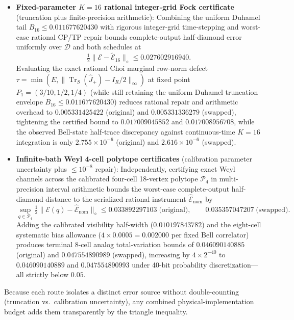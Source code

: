 \documentclass[11pt,letterpaper]{article}
\theoremstyle{definition}
\providecommand{\tightlist}{\setlength{\itemsep}{2pt}\setlength{\parskip}{0pt}}
\begin{document}
\begin{itemize}
\tightlist
\item
  \textbf{Fixed-parameter \(K=16\) rational integer-grid Fock
  certificate} (truncation plus finite-precision arithmetic): Combining
  the uniform Duhamel tail \(B_{16} \le 0.011677620430\) with rigorous
  integer-grid time-stepping and worst-case rational CP/TP repair bounds
  complete-output half-diamond error uniformly over \(\mathcal{D}\) and
  both schedules at
  \[\tfrac{1}{2}\|\mathcal{E} - \widetilde{\mathcal{E}}_{16}\|_\diamond \le 0.027602916940.\]
  Evaluating the exact rational Choi marginal row-norm defect
  \(\tau = \min(E, \|\operatorname{Tr}_S(\hat{J}_+) - I_R/2\|_\infty)\)
  at fixed point \(P_1 = (3/10, 1/2, 1/4)\) (while still retaining the
  uniform Duhamel truncation envelope \(B_{16} \le 0.011677620430\))
  reduces rational repair and arithmetic overhead to \(0.005331425422\)
  (original) and \(0.005331336279\) (swapped), tightening the certified
  bound to \(0.017009045852\) and \(0.017008956708\), while the observed
  Bell-state half-trace discrepancy against continuous-time \(K=16\)
  integration is only \(2.755 \times 10^{-6}\) (original) and
  \(2.616 \times 10^{-6}\) (swapped).
\item
  \textbf{Infinite-bath Weyl 4-cell polytope certificates} (calibration
  parameter uncertainty plus \(\le 10^{-8}\) repair): Independently,
  certifying exact Weyl channels across the calibrated four-cell
  18-vertex polytope \(\mathcal{P}_4\) in multi-precision interval
  arithmetic bounds the worst-case complete-output half-diamond distance
  to the serialized rational instrument
  \(\widehat{\mathcal{E}}_{\mathrm{nom}}\) by
  \[\sup_{q \in \mathcal{P}_4}\tfrac{1}{2}\|\mathcal{E}(q) - \widehat{\mathcal{E}}_{\mathrm{nom}}\|_\diamond \le 0.033892297103 \;\text{(original)}, \qquad 0.035357047207 \;\text{(swapped)}.\]
  Adding the calibrated visibility half-width (\(0.010197843782\)) and
  the eight-cell systematic bias allowance
  (\(4 \times 0.0005 = 0.002000\) per fixed Bell correlator) produces
  terminal 8-cell analog total-variation bounds of \(0.046090140885\)
  (original) and \(0.047554890989\) (swapped), increasing by
  \(4 \times 2^{-40}\) to \(0.046090140889\) and \(0.047554890993\)
  under 40-bit probability discretization---all strictly below \(0.05\).
\end{itemize}

Because each route isolates a distinct error source without
double-counting (truncation vs.~calibration uncertainty), any combined
physical-implementation budget adds them transparently by the triangle
inequality.
\end{document}
